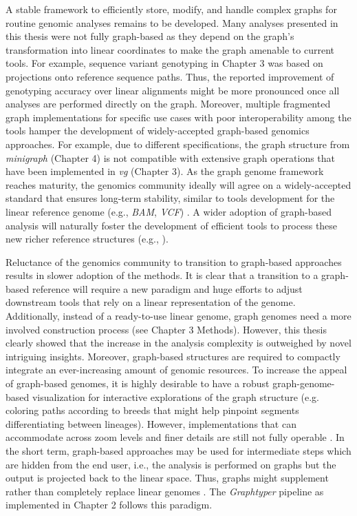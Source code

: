 \documentclass[../main.tex]{subfiles}
\begin{document}
A stable framework to efficiently store, modify, and handle complex graphs for routine genomic analyses remains to be developed. Many analyses presented in this thesis were not fully graph-based as they depend on the graph’s transformation into linear coordinates to make the graph amenable to current tools. For example, sequence variant genotyping in Chapter 3 was based on projections onto reference sequence paths. Thus, the reported improvement of genotyping accuracy over linear alignments might be more pronounced once all analyses are performed directly on the graph. Moreover, multiple fragmented graph implementations for specific use cases with poor interoperability among the tools hamper the development of widely-accepted graph-based genomics approaches. For example, due to different specifications, the graph structure from \emph{minigraph} (Chapter 4) is not compatible with extensive graph operations that have been implemented in \emph{vg} (Chapter 3). As the graph genome framework reaches maturity, the genomics community ideally will agree on a widely-accepted standard that ensures long-term stability, similar to  tools development for the linear reference genome (e.g., \emph{BAM}, \emph{VCF}) \citep{bonfield2021htslib}. A wider adoption of graph-based analysis will naturally foster the development of efficient tools to process these new richer reference structures (e.g., \citep{qiu2021constructing,schulz2020detecting}).

Reluctance of the genomics community to transition to graph-based approaches results in slower adoption of the methods. It is clear that a transition to a graph-based reference will require a new paradigm and huge efforts to adjust downstream tools that rely on a linear representation of the genome. Additionally, instead of a ready-to-use linear genome, graph genomes need a more involved construction process (see Chapter 3 Methods). However, this thesis clearly showed that the increase in the analysis complexity is outweighed by novel intriguing insights. Moreover, graph-based structures are required to compactly integrate an ever-increasing amount of genomic resources. To increase the appeal of graph-based genomes, it is highly desirable to have a robust graph-genome-based visualization for interactive explorations of the graph structure (e.g. coloring paths according to breeds that might help pinpoint segments differentiating between lineages). However, implementations that can accommodate across zoom levels and finer details are still not fully operable \citep{yokoyama2019momi,beyer2019sequence,eizenga2020pangenome}. In the short term, graph-based approaches may be used for intermediate steps which are hidden from the end user, i.e., the analysis is performed on graphs but the output is projected back to the linear space. Thus, graphs might supplement rather than completely replace linear genomes \citep{kim2019graph,grytten2020assessing,li2020design,siren2020genotyping}. The \emph{Graphtyper} pipeline as implemented in Chapter 2 follows this paradigm. 
\end{document}

